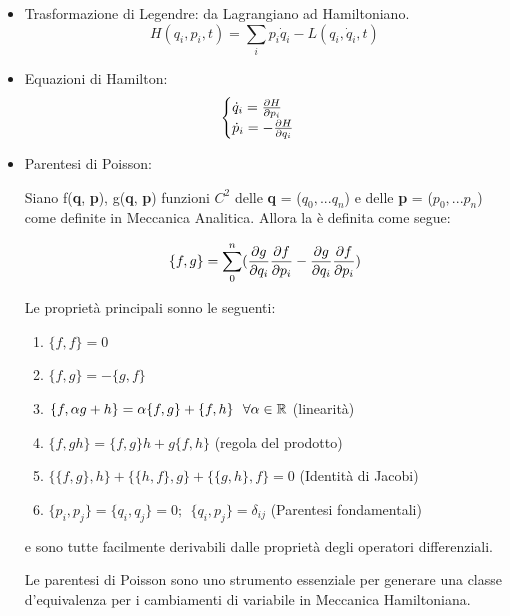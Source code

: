 \begin{itemize}
	\item Trasformazione di Legendre: da Lagrangiano ad Hamiltoniano. 
	\[
		H(q_i, p_i, t) = \sum_i p_i \dot q_i - L(q_i, \dot q_i, t)
	\]
	\item Equazioni di Hamilton: 
	\[
	\begin{cases}
		\dot q_i = \deriv[p_i]{H} \\
		\dot p_i = -\deriv[q_i]{H}
	\end{cases}
	\]
	\item Parentesi di Poisson: 
\begin{definizione}
	Siano f(\textbf{q}, \textbf{p}), g(\textbf{q}, \textbf{p}) funzioni $C^2$ delle \textbf{q} = ($q_0, ... q_n$) e delle \textbf{p} = ($p_0, ... p_n$) come definite in Meccanica Analitica. Allora la  è definita come segue:

	\[
		\{f,g\} = \sum_0^n (\deriv[q_i]{g}\deriv[p_i]{f} - \deriv[q_i]{g}\deriv[p_i]{f})
	\] 
	
	Le proprietà principali sonno le seguenti:

	\begin{enumerate}
		\item \( \{f,f\} = 0 \)
		\item \( \{f,g\} = -\{g,f\} \)
		\item \( \{f,\alpha g + h\} = \alpha\{f,g\} + \{f,h\} \ \  \forall \alpha \in \R \) (linearità)
		\item \( \{f,gh\} = \{f,g\}h + g\{f,h\} \) (regola del prodotto)
		\item \( \{\{f,g\},h\} + \{\{h,f\},g\} + \{\{g,h\},f\} = 0 \) (Identità di Jacobi)
		\item \( \{p_i,p_j\} = \{q_i,q_j\} = 0;\ \ \{q_i,p_j\} = \delta_{ij} \) (Parentesi fondamentali)
	\end{enumerate}
	e sono tutte facilmente derivabili dalle proprietà degli operatori differenziali.

\end{definizione}

Le parentesi di Poisson sono uno strumento essenziale per generare una classe d'equivalenza per i cambiamenti di variabile in Meccanica Hamiltoniana.
\end{itemize}

